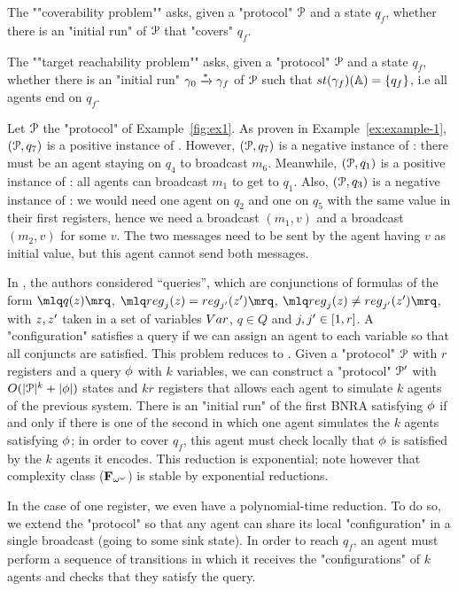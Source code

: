 	
\begin{definition}

	\AP The ""coverability problem"" \COVER asks, given a "protocol" $\mathcal{P}$ and a state $q_f$, whether there is an "initial run" of $\mathcal{P}$ that "covers" $q_f$.
	
	\AP The ""target reachability problem"" \TARGET asks, given a "protocol" $\mathcal{P}$ and a state $q_f$, whether there is an "initial run" $\gamma_0 \xrightarrow{*} \gamma_f$ of $\mathcal{P}$ such that $\st{\config_f}(\agents) = \{q_f\}$, i.e all agents end on $q_f$.
\end{definition}

\begin{example}\label{example-2}
	Let $\mathcal{P}$ the "protocol" of Example~\ref{fig:ex1}. As proven in Example~\ref{ex:example-1}, $(\mathcal{P},q_7)$ is a positive instance of \COVER. However, $(\mathcal{P},q_7)$ is a negative instance of \TARGET: there must be an agent staying on $q_4$ to broadcast $m_6$. Meanwhile, $(\mathcal{P},q_1)$ is a positive instance of \TARGET: all agents can broadcast $m_1$ to get to $q_1$. Also, $(\mathcal{P}, q_3)$ is a negative instance of \COVER: we would need one agent on $q_2$ and one on $q_5$ with the same value in their first registers, hence we need a broadcast $(m_1,v)$ and a broadcast $(m_2,v)$ for some $v$. The two messages need to be sent by the agent having $v$ as initial value, but this agent cannot send both messages.
\end{example}

\begin{remark}
	In \cite{DelzannoST13}, the authors considered ``queries'', which are conjunctions of formulas of the form $\quotemarks{q(\var{z})}$, $\quotemarks{\mathsf{reg}_j(\var{z}) = \mathsf{reg}_{j'}(\var{z}')}$, $\quotemarks{\mathsf{reg}_j(\var{z}) \neq \mathsf{reg}_{j'}(\var{z}')}$, with $\var{z}, \var{z}'$ taken in a set of variables $\varset$, $q\in Q$ and $j,j' \in [1,r]$. A "configuration" satisfies a query if we can assign an agent to each variable so that all conjuncts are satisfied.
	This problem reduces to \COVER.
	Given a "protocol" $\mathcal{P}$ with $r$ registers and a query $\phi$ with $k$ variables, we can construct a "protocol" $\mathcal{P}'$ with $O(|\mathcal{P}|^k + |\phi|)$ states and $kr$ registers that allows each agent to simulate $k$ agents of the previous system.
	There is an "initial run" of the first BNRA satisfying $\phi$ if and only if there is one of the second in which one agent simulates the $k$ agents satisfying $\phi$; in order to cover $q_f$, this agent must check locally that $\phi$ is satisfied by the $k$ agents it encodes.
	This reduction is exponential; note however that complexity class ($\mathbf{F}_{\omega^{\omega}}$) is stable by exponential reductions.
	
	In the case of one register, we even have a polynomial-time reduction. To do so, we extend the "protocol" so that any agent can share its local "configuration" in a single broadcast (going to some sink state).
	In order to reach $q_f$, an agent must perform a sequence of transitions in which it receives the "configurations" of $k$ agents and checks that they satisfy the query.
\end{remark}

